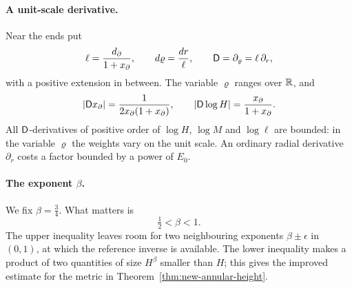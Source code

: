 \paragraph{A unit-scale derivative.}
Near the ends put
\[
 \ell=\frac{d_\partial}{1+x_\partial},\qquad
 d\varrho=\frac{dr}{\ell},\qquad \mathsf D=\partial_\varrho=\ell\,\partial_r ,
\]
with a positive extension in between. The variable $\varrho$ ranges
over $\mathbb R$, and
\[
 |\mathsf D x_\partial|=\frac1{2x_\partial(1+x_\partial)},\qquad
 |\mathsf D\log H|=\frac{x_\partial}{1+x_\partial}.
\]
All $\mathsf D$-derivatives of positive order of $\log H$, $\log M$ and
$\log\ell$ are bounded: in the variable $\varrho$ the weights vary on
the unit scale. An ordinary radial derivative $\partial_r$ costs a
factor bounded by a power of $E_0$.

\paragraph{The exponent $\beta$.}
We fix $\beta=\tfrac34$. What matters is
\begin{equation}\label{eq:beta-choice}
 \tfrac12<\beta<1 .
\end{equation}
The upper inequality leaves room for two neighbouring exponents
$\beta\pm\epsilon$ in $(0,1)$, at which the reference inverse is
available. The lower inequality makes a product of two quantities of
size $H^\beta$ smaller than $H$; this gives the improved estimate for
the metric in Theorem~\ref{thm:new-annular-height}.

